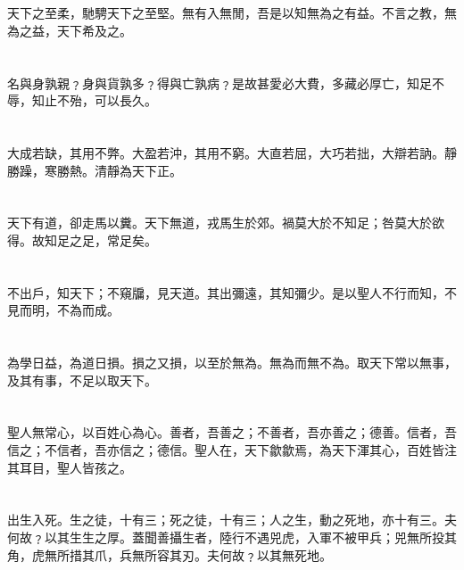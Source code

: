 \documentclass[11pt,oneside]{article}
\begin{document}
\section{}
\label{sec:orgheadline42}
天下之至柔，馳騁天下之至堅。無有入無閒，吾是以知無為之有益。不言之教，無為之益，天下希及之。

\section{}
\label{sec:orgheadline43}
名與身孰親﹖身與貨孰多﹖得與亡孰病﹖是故甚愛必大費，多藏必厚亡，知足不辱，知止不殆，可以長久。

\section{}
\label{sec:orgheadline44}
大成若缺，其用不弊。大盈若沖，其用不窮。大直若屈，大巧若拙，大辯若訥。靜勝躁，寒勝熱。清靜為天下正。

\section{}
\label{sec:orgheadline45}
天下有道，卻走馬以糞。天下無道，戎馬生於郊。禍莫大於不知足；咎莫大於欲得。故知足之足，常足矣。

\section{}
\label{sec:orgheadline46}
不出戶，知天下；不窺牖，見天道。其出彌遠，其知彌少。是以聖人不行而知，不見而明，不為而成。

\section{}
\label{sec:orgheadline47}
為學日益，為道日損。損之又損，以至於無為。無為而無不為。取天下常以無事，及其有事，不足以取天下。

\section{}
\label{sec:orgheadline48}
聖人無常心，以百姓心為心。善者，吾善之；不善者，吾亦善之；德善。信者，吾信之；不信者，吾亦信之；德信。聖人在，天下歙歙焉，為天下渾其心，百姓皆注其耳目，聖人皆孩之。

\section{}
\label{sec:orgheadline49}
出生入死。生之徒，十有三；死之徒，十有三；人之生，動之死地，亦十有三。夫何故﹖以其生生之厚。蓋聞善攝生者，陸行不遇兕虎，入軍不被甲兵；兕無所投其角，虎無所措其爪，兵無所容其刃。夫何故﹖以其無死地。
\end{document}
